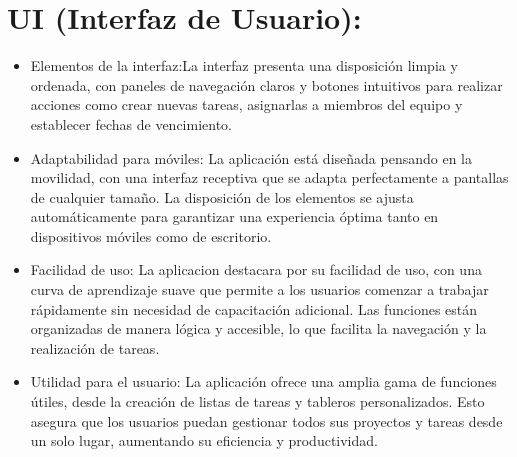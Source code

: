 \section{UI (Interfaz de Usuario):} %
	\begin{itemize}
		\item Elementos de la interfaz:La interfaz presenta una disposición limpia y ordenada, con paneles de navegación claros y botones intuitivos para realizar acciones como crear nuevas tareas, asignarlas a miembros del equipo y establecer fechas de vencimiento.
		\item Adaptabilidad para móviles: La aplicación está diseñada pensando en la movilidad, con una interfaz receptiva que se adapta perfectamente a pantallas de cualquier tamaño. La disposición de los elementos se ajusta automáticamente para garantizar una experiencia óptima tanto en dispositivos móviles como de escritorio.
		\item Facilidad de uso: La aplicacion destacara por su facilidad de uso, con una curva de aprendizaje suave que permite a los usuarios comenzar a trabajar rápidamente sin necesidad de capacitación adicional. Las funciones están organizadas de manera lógica y accesible, lo que facilita la navegación y la realización de tareas.
		\item Utilidad para el usuario:
		La aplicación ofrece una amplia gama de funciones útiles, desde la creación de listas de tareas y tableros personalizados. Esto asegura que los usuarios puedan gestionar todos sus proyectos y tareas desde un solo lugar, aumentando su eficiencia y productividad.
	\end{itemize}
\label{sec:ui_interfaz_de_usuario_}
